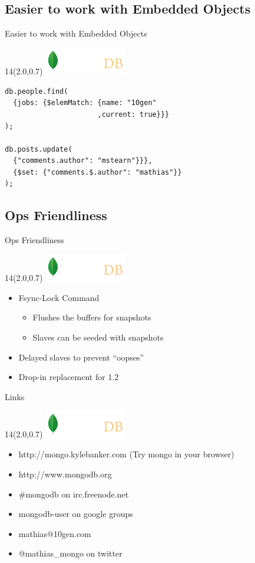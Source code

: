 \documentclass{beamer}
\newcommand{\MongoLogo}{
\begin{textblock}{14}(2.0,0.7)
  \includegraphics[height=1.2cm]{logo-mongodb-ondark.png}
\end{textblock}
}
\begin{document}
\subsection{Easier to work with Embedded Objects}
\begin{frame}[fragile]{Easier to work with Embedded Objects}
  \MongoLogo
  \begin{verbatim}
db.people.find(
  {jobs: {$elemMatch: {name: "10gen"
                      ,current: true}}}
);

db.posts.update(
  {"comments.author": "mstearn"}}},
  {$set: {"comments.$.author": "mathias"}}
);
  \end{verbatim}
\end{frame}

\subsection{Ops Friendliness}
\begin{frame}{Ops Friendliness}
  \MongoLogo
  \begin{itemize}
    \item Fsync-Lock Command
      \begin{itemize}
        \item Flushes the buffers for snapshots
        \item Slaves can be seeded with snapshots
      \end{itemize}
    \item Delayed slaves to prevent ``oopses''
    \item Drop-in replacement for 1.2
  \end{itemize}
\end{frame}



\begin{frame}{Links}
  \MongoLogo

  \begin{itemize}
    \item http://mongo.kylebanker.com (Try mongo in your browser)
    \item http://www.mongodb.org
    \item \#mongodb on irc.freenode.net
    \item mongodb-user on google groups
  \end{itemize}
  \begin{itemize}
    \item mathias@10gen.com
    \item @mathias\_mongo on twitter
  \end{itemize}
\end{frame}
\end{document}
